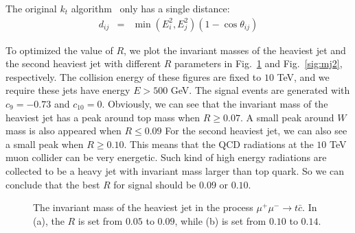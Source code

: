 \documentclass[a4paper,11pt]{article}
\begin{document}
The original $k_t$ algorithm~\cite{Catani:1991hj} only has a single distance:
\begin{eqnarray}
  d_{ij} &=& \min(E^{2}_i,E^{2}_j)\left(1-\cos\theta_{ij}\right) 
\end{eqnarray}

To optimized the value of $R$, we plot the invariant masses of the heaviest jet and the second heaviest jet with different $R$ parameters in Fig.~\ref{sig:mj1} and Fig.~\ref{sig:mj2}, respectively.
The collision energy of these figures are fixed to $10$ TeV, and we require these jets have energy $E>500$ GeV. 
The signal events are generated with $c_{9}=-0.73$ and $c_{10}=0$.
Obviously, we can see that the invariant mass of the heaviest jet has a peak around top mass when $R\geq 0.07$.  
A small peak around $W$ mass is also appeared when $R\leq 0.09$
For the second heaviest jet, we can also see a small peak when $R\geq 0.10$. 
This means that the QCD radiations at the $10$ TeV muon collider can be very energetic. 
Such kind of high energy radiations are collected to be a heavy jet with invariant mass larger than top quark. 
So we can conclude that the best $R$ for signal should be $0.09$ or $0.10$.

\begin{figure}[htbp]
  \centering
  \caption{The invariant mass of the heaviest jet in the process $\mu^+\mu^-\to t\bar{c}$. In (a), the $R$ is set from $0.05$ to $0.09$, while (b) is set from $0.10$ to $0.14$.}\label{sig:mj1}
\end{figure}
\end{document}
